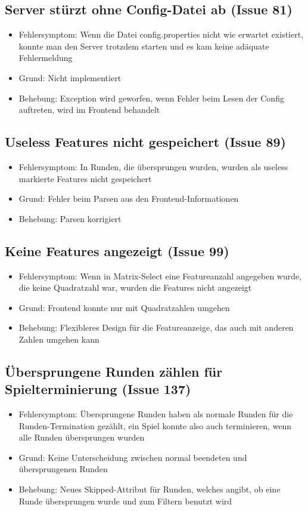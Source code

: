 \documentclass[a4paper]{scrreprt}
\begin{document}
    \subsection{Server stürzt ohne Config-Datei ab (Issue 81)}
    \begin{itemize}
    \item Fehlersymptom: Wenn die Datei config.properties nicht wie erwartet
     existiert, konnte man den Server trotzdem starten und es kam keine 
     adäquate Fehlermeldung
    \item Grund: Nicht implementiert
    \item Behebung: Exception wird geworfen, wenn Fehler beim Lesen der Config
     auftreten, wird im Frontend behandelt
    \end{itemize}
    \subsection{Useless Features nicht gespeichert (Issue 89)}
    \begin{itemize}
    \item Fehlersymptom: In Runden, die übersprungen wurden, wurden als useless
     markierte Features nicht gespeichert
    \item Grund: Fehler beim Parsen aus den Frontend-Informationen
    \item Behebung: Parsen korrigiert
    \end{itemize}
    \subsection{Keine Features angezeigt (Issue 99)}
    \begin{itemize}
    \item Fehlersymptom: Wenn in Matrix-Select eine Featureanzahl angegeben wurde, 
    die keine Quadratzahl war, wurden die Features nicht angezeigt
    \item Grund: Frontend konnte nur mit Quadratzahlen umgehen
    \item Behebung: Flexibleres Design für die Featureanzeige, das auch mit anderen
     Zahlen umgehen kann
    \end{itemize}
    \subsection{Übersprungene Runden zählen für Spielterminierung (Issue 137)}
    \begin{itemize}
    \item Fehlersymptom: Übersprungene Runden haben als normale Runden für die
     Runden-Termination gezählt, ein Spiel konnte also auch terminieren, wenn alle
      Runden übersprungen wurden
    \item Grund: Keine Unterscheidung zwischen normal beendeten und übersprungenen
     Runden 
    \item Behebung: Neues Skipped-Attribut für Runden, welches angibt, ob eine
     Runde übersprungen wurde und zum Filtern benutzt wird
    \end{itemize}
\end{document}
